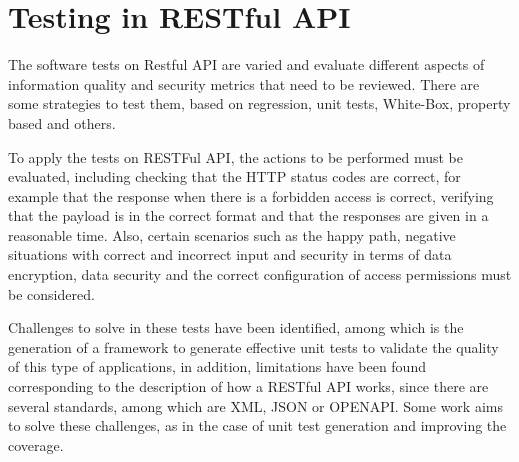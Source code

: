 \section{Testing in RESTful API}

The software tests on Restful API\cite{Golmohammadi2023} are varied and evaluate different aspects of information quality and security metrics that need to be reviewed. There are some strategies to test them, based on regression\cite{Godefroid2020}, unit tests\cite{Golmohammadi2023}, White-Box\cite{Arcuri2021}, property based\cite{Karlsson2020} and others.


To apply the tests on RESTFul API\cite{De2017}, the actions to be performed must be evaluated, including checking that the HTTP status codes are correct, for example that the response when there is a forbidden access is correct, verifying that the payload is in the correct format and that the responses are given in a reasonable time. Also, certain scenarios such as the happy path, negative situations with correct and incorrect input and security in terms of data encryption, data security and the correct configuration of access permissions must be considered.

Challenges to solve in these tests have been identified\cite{Ehsan2022}, among which is the generation of a framework to generate effective unit tests to validate the quality of this type of applications, in addition, limitations have been found corresponding to the description of how a RESTful API works, since there are several standards, among which are XML, JSON or OPENAPI.  Some work aims to solve these challenges, as in the case of unit test generation\cite{Arcuri2019,segura2018,Arcuri2017,Viglianisi2020} and improving the coverage\cite{Wu2022}.
